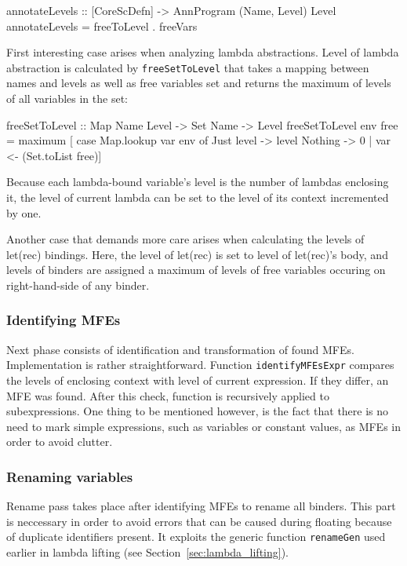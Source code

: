 \documentclass[12pt,a4paper]{report}
\begin{document}
\vspace*{0.2in}
\begin{code}[style=haskell]
annotateLevels :: [CoreScDefn] -> AnnProgram (Name, Level) Level
annotateLevels = freeToLevel . freeVars
\end{code}

First interesting case arises when analyzing lambda abstractions. Level of
lambda abstraction is calculated by \texttt{freeSetToLevel} that takes a
mapping between names and levels as well as free variables set and returns the
maximum of levels of all variables in the set:

\vspace*{0.2in}
\begin{code}[style=haskell]
freeSetToLevel :: Map Name Level -> Set Name -> Level
freeSetToLevel env free =
    maximum [ case Map.lookup var env of
        Just level -> level
        Nothing -> 0 | var <- (Set.toList free)]
\end{code}

Because each lambda-bound variable's level is the number of lambdas enclosing
it, the level of current lambda can be set to the level of its context
incremented by one.

Another case that demands more care arises when calculating the levels of
let(rec) bindings. Here, the level of let(rec) is set to level of let(rec)'s
body, and levels of binders are assigned a maximum of levels of free variables
occuring on right-hand-side of any binder.

\subsubsection{Identifying MFEs}
Next phase consists of identification and transformation of found MFEs.
Implementation is rather straightforward. Function \texttt{identifyMFEsExpr}
compares the levels of enclosing context with level of current expression. If
they differ, an MFE was found. After this check, function is recursively
applied to subexpressions. One thing to be mentioned however, is the fact that
there is no need to mark simple expressions, such as variables or constant
values, as MFEs in order to avoid clutter.

\subsubsection{Renaming variables}
Rename pass takes place after identifying MFEs to rename all binders. This
part is neccessary in order to avoid errors that can be caused during floating
because of duplicate identifiers present. It exploits the generic function
\texttt{renameGen} used earlier in lambda lifting (see
Section~\ref{sec:lambda_lifting}).
\end{document}
